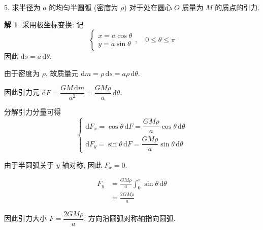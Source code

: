 \documentclass[a4paper,12pt]{article}
\theoremstyle{definition}
\newtheorem*{sol}{解}
\begin{document}
5. 求半径为 $a$ 的均匀半圆弧 (密度为 $\rho$) 对于处在圆心 $O$ 质量为 $M$ 的质点的引力.
\begin{sol}
    采用极坐标变换: 记
    $$
        \begin{cases}
            x = a\cos \theta \\
            y = a\sin \theta
        \end{cases}, \quad 0 \leq \theta \leq \pi
    $$
    因此 $\mathrm{d}s = a \, \mathrm{d}\theta$.

    由于密度为 $\rho$, 故质量元 $\mathrm{d}m = \rho \, \mathrm{d}s = a\rho \, \mathrm{d}\theta$.

    因此引力元 $\mathrm{d}F = \dfrac{GM \, \mathrm{d}m}{a^2} = \dfrac{GM\rho}{a} \, \mathrm{d}\theta$.

    分解引力分量可得
    $$
        \begin{cases}
            \mathrm{d}F_x = \cos\theta \, \mathrm{d}F = \dfrac{GM\rho}{a}\cos\theta \, \mathrm{d}\theta \\[8pt]
            \mathrm{d}F_y = \sin\theta \, \mathrm{d}F = \dfrac{GM\rho}{a}\sin\theta \, \mathrm{d}\theta
        \end{cases}
    $$

    由于半圆弧关于 $y$ 轴对称, 因此 $F_x = 0$.

    \begin{align*}
        F_y & = \frac{GM\rho}{a} \int_0^{\pi} \sin\theta \, \mathrm{d}\theta \\
            & = \frac{2GM\rho}{a}
    \end{align*}

    因此引力大小 $F = \dfrac{2GM\rho}{a}$, 方向沿圆弧对称轴指向圆弧.
\end{sol}
\end{document}
